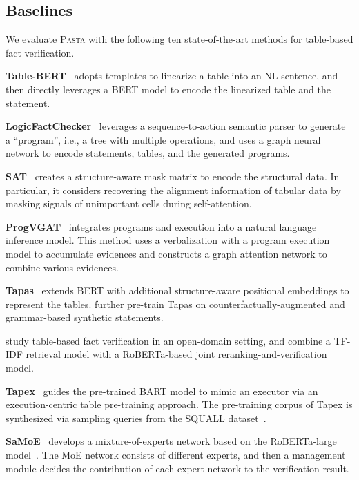\documentclass[11pt]{article}
\newcommand{\pasta}{\textsc{Pasta}\xspace}
\newcommand{\ie}{{i.e.,}\xspace}
\newcommand{\term}[1]{\xspace}
\newcommand{\sstab}{\vspace{0.2ex}\noindent}
\begin{document}
\subsection{Baselines}
We evaluate \pasta with the following ten state-of-the-art methods for table-based fact verification. 


\sstab
{\bf Table-BERT}~\cite{tabfact} adopts templates to linearize a table into an NL sentence, 
and then directly leverages a BERT model to encode the linearized table and the statement.


\sstab
{\bf LogicFactChecker}~\cite{logicfactchecker} leverages a sequence-to-action semantic parser to generate a ``program'', \ie a tree with multiple operations, 
and uses a graph neural network to encode statements, tables, and the generated programs.




\sstab
{\bf SAT}~\cite{sat} creates a structure-aware mask matrix to encode the structural data. In particular, it considers recovering the alignment information of tabular data by masking signals of unimportant cells during self-attention.


\sstab
{\bf ProgVGAT}~\cite{progvgat} integrates programs and execution into a natural language inference model. This method uses a verbalization with a program execution model to accumulate evidences and constructs a graph attention network to combine various evidences.




\sstab
{\bf Tapas}~\cite{tapas} extends BERT with additional structure-aware positional embeddings to represent the tables. \citealp{tapasfv} further pre-train Tapas on counterfactually-augmented and grammar-based synthetic statements.

\sstab
{\bf \citealp{joint}} study table-based fact verification in an open-domain setting, and combine a TF-IDF retrieval model with a RoBERTa-based joint reranking-and-verification model.

\sstab
{\bf Tapex}~\cite{tapex} guides the pre-trained BART model to mimic an \term{SQL} executor via an execution-centric table pre-training approach. The pre-training corpus of Tapex is synthesized via sampling \term{SQL} queries from the SQUALL dataset~\cite{squall}.

\sstab
{\bf SaMoE}~\cite{SaMoE} develops a mixture-of-experts network based on the RoBERTa-large model~\cite{roberta}. The MoE network consists of different experts, and then a management module decides the contribution of each expert network to the verification result. 
\end{document}

